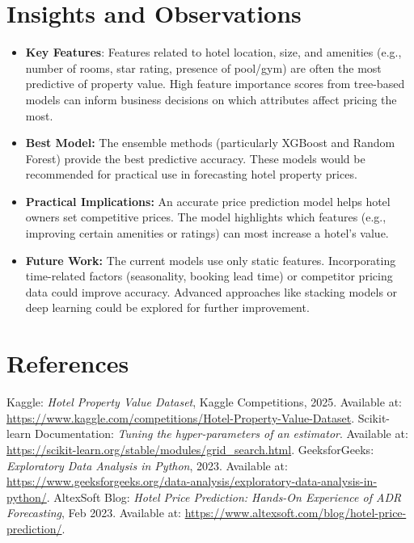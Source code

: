 \documentclass[12pt]{article}
\begin{document}
\section{Insights and Observations}
\begin{itemize}
    \item \textbf{Key Features}: Features related to hotel location, size, and amenities (e.g., number of rooms, star rating, presence of pool/gym) are often the most predictive of property value. High feature importance scores from tree-based models can inform business decisions on which attributes affect pricing the most.
    \item \textbf{Best Model:} The ensemble methods (particularly XGBoost and Random Forest) provide the best predictive accuracy. These models would be recommended for practical use in forecasting hotel property prices.
    \item \textbf{Practical Implications:} An accurate price prediction model helps hotel owners set competitive prices. The model highlights which features (e.g., improving certain amenities or ratings) can most increase a hotel's value.
    \item \textbf{Future Work:} The current models use only static features. Incorporating time-related factors (seasonality, booking lead time) or competitor pricing data could improve accuracy. Advanced approaches like stacking models or deep learning could be explored for further improvement.
\end{itemize}

\section{References}
\begin{thebibliography}{9}
 Kaggle: \textit{Hotel Property Value Dataset}, Kaggle Competitions, 2025. Available at: \url{https://www.kaggle.com/competitions/Hotel-Property-Value-Dataset}.
 Scikit-learn Documentation: \textit{Tuning the hyper-parameters of an estimator}. Available at: \url{https://scikit-learn.org/stable/modules/grid_search.html}.
 GeeksforGeeks: \textit{Exploratory Data Analysis in Python}, 2023. Available at: \url{https://www.geeksforgeeks.org/data-analysis/exploratory-data-analysis-in-python/}.
 AltexSoft Blog: \textit{Hotel Price Prediction: Hands-On Experience of ADR Forecasting}, Feb 2023. Available at: \url{https://www.altexsoft.com/blog/hotel-price-prediction/}.
\end{thebibliography}
\end{document}
